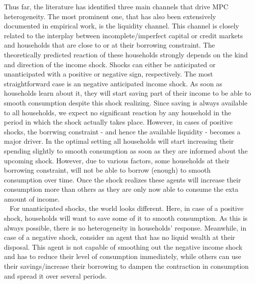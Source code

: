 Thus far, the literature has identified three main channels that drive MPC heterogeneity. The most prominent one, that has also been extensively documented in empirical work, is the liquidity channel. This channel is closely related to the interplay between incomplete/imperfect capital or credit markets and households that are close to or at their borrowing constraint. The theoretically predicted reaction of these households strongly depends on the kind and direction of the income shock. Shocks can either be anticipated or unanticipated with a positive or negative sign, respectively. The most straightforward case is an negative anticipated income shock. As soon as households learn about it, they will start saving part of their income to be able to smooth consumption despite this shock realizing. Since saving is always available to all households, we expect no significant reaction by any household in the period in which the shock actually takes place. However, in cases of positive shocks, the borrwing constraint - and hence the available liquidity - becomes a major driver. In the optimal setting all households will start increasing their spending slightly to smooth consumption as soon as they are informed about the upcoming shock. However, due to various factors, some households at their borrowing constraint, will not be able to borrow (enough) to smooth consumption over time. Once the shock realizes these agents will increase their consumption more than others as they are only now able to consume the exta amount of income. \\ 
For unanticipated shocks, the world looks different. Here, in case of a positive shock, households will want to save some of it to smooth consumption. As this is always possible, there is no heterogeneity in households' response. Meanwhile, in case of a negative shock, consider an agent that has no liquid wealth at their disposal. This agent is not capable of smoothing out the negative income shock and has to reduce their level of consumption immediately, while others can use their savings/increase their borrowing to dampen the contraction in consumption and spread it over several periods. \\ 

